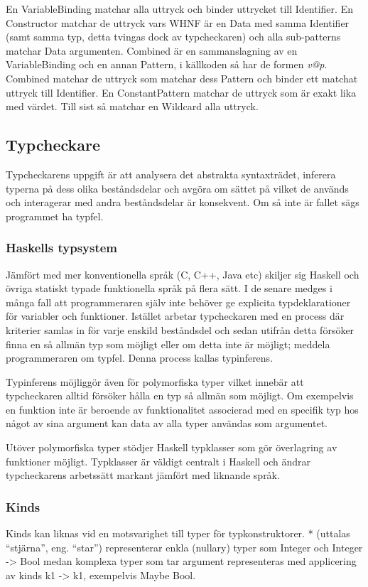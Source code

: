 En VariableBinding matchar alla uttryck och binder uttrycket till Identifier. En Constructor matchar de uttryck vars WHNF är en Data med samma Identifier (samt samma typ, detta tvingas dock av typcheckaren) och alla sub-patterns matchar Data argumenten. Combined är en sammanslagning av en VariableBinding och en annan Pattern, i källkoden så har de formen \emph{v@p}. Combined matchar de uttryck som matchar dess Pattern och binder ett matchat uttryck till Identifier. En ConstantPattern matchar de uttryck som är exakt lika med värdet. Till sist så matchar en Wildcard alla uttryck.

\subsection{Typcheckare} 
Typcheckarens uppgift är att analysera det abstrakta syntaxträdet, inferera typerna på dess olika
beståndsdelar och avgöra om sättet på vilket de används och interagerar med
andra beståndsdelar är konsekvent. Om så inte är fallet sägs programmet ha
typfel.

\subsubsection{Haskells typsystem}
Jämfört med mer konventionella språk (C, C++, Java etc) skiljer sig Haskell
och övriga statiskt typade funktionella språk på flera sätt. I de senare
medges i många fall att programmeraren själv inte behöver ge explicita
typdeklarationer för variabler och funktioner. Istället arbetar typcheckaren
med en process där kriterier samlas in för varje enskild beståndsdel och
sedan utifrån detta försöker finna en så allmän typ som möjligt eller om
detta inte är möjligt; meddela programmeraren om typfel. Denna process
kallas typinferens.

Typinferens möjliggör även för polymorfiska typer vilket innebär att
typcheckaren alltid försöker hålla en typ så allmän som möjligt. Om
exempelvis en funktion inte är beroende av funktionalitet associerad med en
specifik typ hos något av sina argument kan data av alla typer användas som
argumentet.

Utöver polymorfiska typer stödjer Haskell typklasser som gör överlagring av
funktioner möjligt. Typklasser är väldigt centralt i Haskell och ändrar
typcheckarens arbetssätt markant jämfört med liknande språk.

\subsubsection{Kinds}
Kinds kan liknas vid en motsvarighet till typer för typkonstruktorer. * (uttalas ``stjärna'', eng. ``star'') representerar enkla (nullary) typer som Integer och Integer -> Bool medan komplexa typer som tar argument representeras med applicering av kinds k1 -> k1, exempelvis Maybe Bool.

